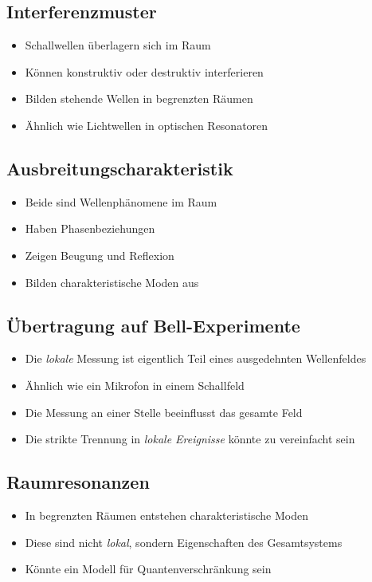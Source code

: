 \documentclass[12pt,a4paper]{article}
\begin{document}
	
	
	\subsection{Interferenzmuster}
	\begin{itemize}
		\item Schallwellen überlagern sich im Raum
		\item Können konstruktiv oder destruktiv interferieren
		\item Bilden stehende Wellen in begrenzten Räumen
		\item Ähnlich wie Lichtwellen in optischen Resonatoren
	\end{itemize}
	
	\subsection{Ausbreitungscharakteristik}
	\begin{itemize}
		\item Beide sind Wellenphänomene im Raum
		\item Haben Phasenbeziehungen
		\item Zeigen Beugung und Reflexion
		\item Bilden charakteristische Moden aus
	\end{itemize}
	
	\subsection{Übertragung auf Bell-Experimente}
	\begin{itemize}
		\item Die \textit{lokale} Messung ist eigentlich Teil eines ausgedehnten Wellenfeldes
		\item Ähnlich wie ein Mikrofon in einem Schallfeld
		\item Die Messung an einer Stelle beeinflusst das gesamte Feld
		\item Die strikte Trennung in \textit{lokale Ereignisse} könnte zu vereinfacht sein
	\end{itemize}
	
	\subsection{Raumresonanzen}
	\begin{itemize}
		\item In begrenzten Räumen entstehen charakteristische Moden
		\item Diese sind nicht \textit{lokal}, sondern Eigenschaften des Gesamtsystems
		\item Könnte ein Modell für Quantenverschränkung sein
	\end{itemize}
	
\end{document}

